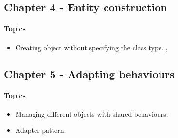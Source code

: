 \subsection{Chapter 4 - Entity construction}
\paragraph*{Topics}			
\begin{itemize}
	\item Creating object without specifying the class type. , 
\end{itemize}


\subsection{Chapter 5 - Adapting behaviours}
\paragraph*{Topics}			
\begin{itemize}
	\item Managing different objects with shared behaviours. 
	\item Adapter pattern. 
\end{itemize}